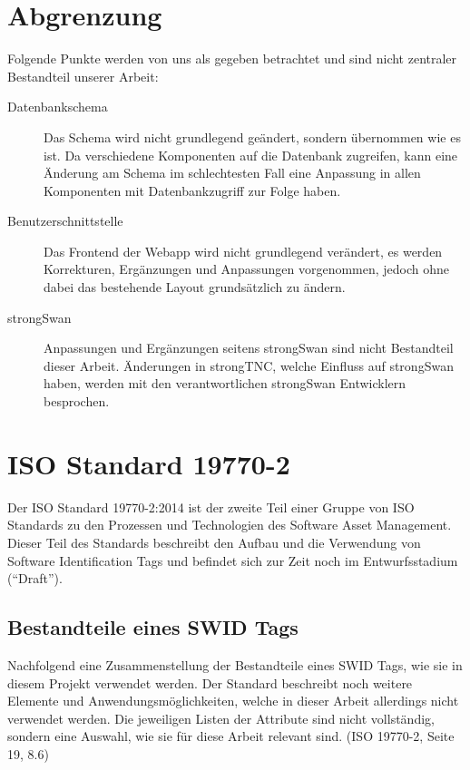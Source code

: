 \section{Abgrenzung}
Folgende Punkte werden von uns als gegeben betrachtet und sind nicht zentraler
Bestandteil unserer Arbeit:

\begin{description}
	\item[Datenbankschema] Das Schema wird nicht grundlegend geändert, sondern
	übernommen wie es ist. Da verschiedene Komponenten auf die Datenbank zugreifen,
	kann eine Änderung am Schema im schlechtesten Fall eine Anpassung in allen
	Komponenten mit Datenbankzugriff zur Folge haben.

	\item[Benutzerschnittstelle] Das Frontend der Webapp wird nicht grundlegend
	verändert, es werden Korrekturen, Ergänzungen und Anpassungen vorgenommen,
	jedoch ohne dabei das bestehende Layout grundsätzlich zu ändern.

	\item[strongSwan] Anpassungen und Ergänzungen seitens strongSwan sind nicht
	Bestandteil dieser Arbeit. Änderungen in strongTNC, welche Einfluss auf
	strongSwan haben, werden mit den verantwortlichen strongSwan Entwicklern
	besprochen.
\end{description}

\section{ISO Standard 19770-2}
\label{analyse:swidstandard} 
Der ISO Standard 19770-2:2014 ist der zweite Teil einer Gruppe von ISO Standards
zu den Prozessen und Technologien des Software Asset Management. Dieser Teil des
Standards beschreibt den Aufbau und die Verwendung von Software Identification
Tags und befindet sich zur Zeit noch im Entwurfsstadium (\enquote{Draft}).

\subsection{Bestandteile eines SWID Tags}
Nachfolgend eine Zusammenstellung der Bestandteile eines SWID Tags, wie sie in
diesem Projekt verwendet werden. Der Standard beschreibt noch weitere Elemente
und Anwendungsmöglichkeiten, welche in dieser Arbeit allerdings nicht verwendet
werden. Die jeweiligen Listen der Attribute sind nicht vollständig, sondern eine
Auswahl, wie sie für diese Arbeit relevant sind. (ISO
19770-2\cite{iso19770-2}, Seite 19, 8.6)

